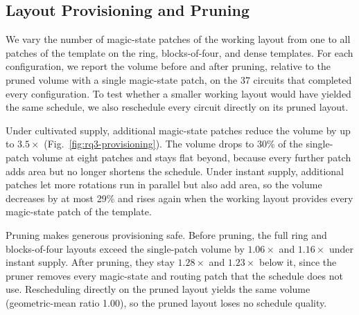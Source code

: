 \subsection{Layout Provisioning and Pruning}
\label{sec:eval-provisioning}




We vary the number of magic-state patches of the working layout from one to all patches of the template on the ring, blocks-of-four, and dense templates.
For each configuration, we report the volume before and after pruning, relative to the pruned volume with a single magic-state patch, on the 37 circuits that completed every configuration.
To test whether a smaller working layout would have yielded the same schedule, we also reschedule every circuit directly on its pruned layout.

Under cultivated supply, additional magic-state patches reduce the volume by up to $3.5\times$ (Fig.~\ref{fig:rq3-provisioning}).
The volume drops to 30\% of the single-patch volume at eight patches and stays flat beyond, because every further patch adds area but no longer shortens the schedule.
Under instant supply, additional patches let more rotations run in parallel but also add area, so the volume decreases by at most 29\% and rises again when the working layout provides every magic-state patch of the template.

Pruning makes generous provisioning safe.
Before pruning, the full ring and blocks-of-four layouts exceed the single-patch volume by $1.06\times$ and $1.16\times$ under instant supply.
After pruning, they stay $1.28\times$ and $1.23\times$ below it, since the pruner removes every magic-state and routing patch that the schedule does not use.
Rescheduling directly on the pruned layout yields the same volume (geometric-mean ratio 1.00), so the pruned layout loses no schedule quality.


